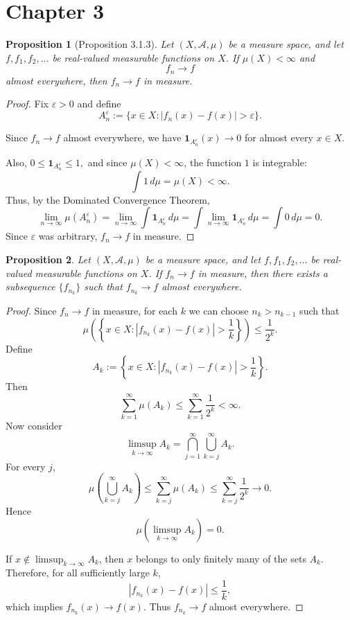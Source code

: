 \documentclass[12pt]{article}
\newtheorem{proposition}{Proposition}
\begin{document}
\section*{Chapter 3}
\begin{proposition}[Proposition 3.1.3]
Let $(X,\mathcal{A},\mu)$ be a measure space, and let $f,f_1,f_2,\dots$ be
real-valued measurable functions on $X$. If $\mu(X)<\infty$ and
\[
f_n \to f
\]
almost everywhere, then $f_n \to f$ in measure.
\end{proposition}

\begin{proof}
Fix $\varepsilon>0$ and define
\[
A_n^\varepsilon:=\{x\in X: |f_n(x)-f(x)|>\varepsilon\}.
\]

Since $f_n\to f$ almost everywhere, we have $\mathbf{1}_{A_n^\varepsilon}(x)\to 0$ for almost every $x\in X$.

Also, $0\le \mathbf{1}_{A_n^\varepsilon}\le 1,$
and since $\mu(X)<\infty$, the function $1$ is integrable:
\[
\int 1\,d\mu=\mu(X)<\infty.
\]
Thus, by the Dominated Convergence Theorem,
\[
\lim_{n\to\infty}\mu(A_n^\varepsilon)
=
\lim_{n\to\infty}\int \mathbf{1}_{A_n^\varepsilon}\,d\mu
=
\int \lim_{n\to\infty}\mathbf{1}_{A_n^\varepsilon}\,d\mu
=
\int 0\,d\mu
=
0.
\]
Since $\varepsilon$ was arbitrary, $f_n\to f$ in measure.
\end{proof}

\begin{proposition}
Let $(X,\mathcal{A},\mu)$ be a measure space, and let $f,f_1,f_2,\dots$ be
real-valued measurable functions on $X$. If $f_n\to f$ in measure, then there
exists a subsequence $\{f_{n_k}\}$ such that $f_{n_k}\to f$ almost everywhere.
\end{proposition}

\begin{proof}
Since $f_n\to f$ in measure, for each $k$ we can choose $n_k>n_{k-1}$ such that
\[
\mu\left(\left\{x\in X: |f_{n_k}(x)-f(x)|>\frac1k\right\}\right)
\le \frac1{2^k}.
\]
Define
\[
A_k:=\left\{x\in X: |f_{n_k}(x)-f(x)|>\frac1k\right\}.
\]
Then
\[
\sum_{k=1}^\infty \mu(A_k) \le \sum_{k=1}^\infty \frac1{2^k}<\infty.
\]
Now consider
\[
\limsup_{k\to\infty} A_k
=
\bigcap_{j=1}^\infty \bigcup_{k=j}^\infty A_k.
\]
For every $j$,
\[
\mu\left(\bigcup_{k=j}^\infty A_k\right)
\le
\sum_{k=j}^\infty \mu(A_k)
\le
\sum_{k=j}^\infty \frac1{2^k}
\to 0.
\]
Hence
\[
\mu\left(\limsup_{k\to\infty} A_k\right)=0.
\]

If $x\notin \limsup_{k\to\infty} A_k$, then $x$ belongs to only finitely many
of the sets $A_k$. Therefore, for all sufficiently large $k$,
\[
|f_{n_k}(x)-f(x)|\le \frac1k,
\]
which implies $f_{n_k}(x)\to f(x)$. Thus $f_{n_k}\to f$ almost everywhere.
\end{proof}
\end{document}
